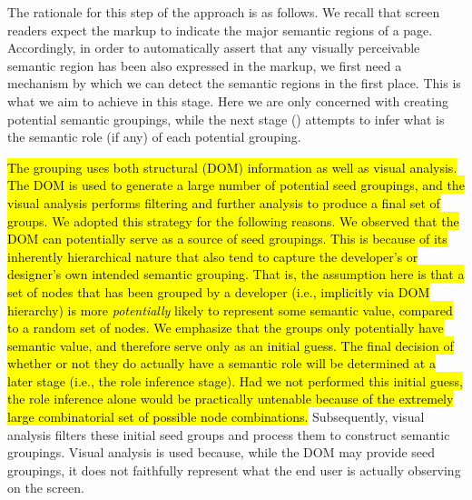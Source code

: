 The rationale for this step of the approach is as follows. 
We recall that screen readers expect the markup to indicate the 
major semantic regions of a page. 
Accordingly, in order to automatically assert that any visually perceivable semantic 
region has been also expressed in the markup, we first need 
a mechanism by which we can detect the semantic regions in the first place. 
This is what we aim to achieve in this stage. 
Here we are only concerned with creating potential semantic groupings, 
while the next stage () attempts to infer what is the semantic 
role (if any) of each potential grouping. 

\hl{
The grouping uses both structural (DOM) information as well as visual analysis. 
The DOM is used to generate a large number of potential seed groupings, 
and the visual analysis performs filtering and further analysis to produce a 
final set of groups.
We adopted this strategy for the following reasons. 
We observed that the DOM can potentially serve as a source of seed groupings. 
This is because of its inherently hierarchical nature that also tend to capture 
the developer's or designer's own intended semantic grouping.
That is, the assumption here is that a set of nodes that has been grouped by a developer 
(i.e., implicitly via DOM hierarchy) is more \emph{potentially} likely to represent some 
semantic value, compared to a random set of nodes. 
We emphasize that the groups only potentially have semantic value, and therefore serve 
only as an initial guess. The final decision 
of whether or not they do actually have a semantic role will be determined at a later stage (i.e., the role inference stage). 
Had we not performed this initial guess, the role inference alone would be practically 
untenable because of the extremely large combinatorial set of possible node combinations. 
}
Subsequently, visual analysis filters these initial seed groups and process 
them to construct semantic groupings. 
Visual analysis is used because, while the DOM may provide seed groupings, 
it does not faithfully represent what the end user is actually observing on the screen. 


